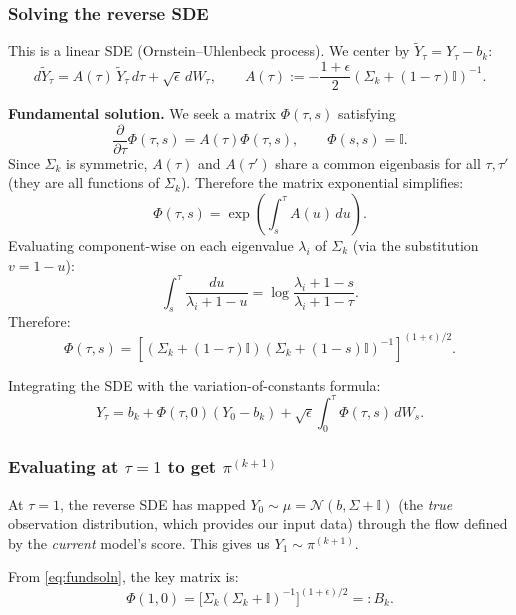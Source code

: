\documentclass[12pt,fleqn]{article}
\numberwithin{equation}{section}
\newcommand{\N}{\mathcal{N}}
\newcommand{\I}{\mathbb{I}}
\begin{document}
\subsubsection{Solving the reverse SDE}

This is a linear SDE (Ornstein--Uhlenbeck process). We center by $\tilde Y_\tau = Y_\tau - b_k$:
\[
	d\tilde Y_\tau = A(\tau)\,\tilde Y_\tau\,d\tau + \sqrt{\epsilon}\,dW_\tau, \qquad A(\tau) := -\frac{1+\epsilon}{2}(\Sigma_k + (1-\tau)\I)^{-1}.
\]

\begin{sidework}
\noindent\textbf{Fundamental solution.} We seek a matrix $\Phi(\tau,s)$ satisfying
\[
	\frac{\partial}{\partial\tau}\Phi(\tau,s) = A(\tau)\Phi(\tau,s), \qquad \Phi(s,s) = \I.
\]
Since $\Sigma_k$ is symmetric, $A(\tau)$ and $A(\tau')$ share a common eigenbasis for all $\tau, \tau'$ (they are all functions of $\Sigma_k$). Therefore the matrix exponential simplifies:
\[
	\Phi(\tau,s) = \exp\!\left(\int_s^\tau A(u)\,du\right).
\]
Evaluating component-wise on each eigenvalue $\lambda_i$ of $\Sigma_k$ (via the substitution $v = 1-u$):
\[
	\int_s^\tau \frac{du}{\lambda_i + 1 - u} = \log\frac{\lambda_i + 1 - s}{\lambda_i + 1 - \tau}.
\]
Therefore:
\begin{equation}
	\Phi(\tau,s) = \left[(\Sigma_k + (1-\tau)\I)(\Sigma_k + (1-s)\I)^{-1}\right]^{(1+\epsilon)/2}. \label{eq:fundsoln}
\end{equation}
\end{sidework}

Integrating the SDE with the variation-of-constants formula:
\begin{equation}
	Y_\tau = b_k + \Phi(\tau,0)(Y_0 - b_k) + \sqrt{\epsilon}\int_0^\tau \Phi(\tau,s)\,dW_s. \label{eq:Ysoln}
\end{equation}

\subsubsection{Evaluating at $\tau = 1$ to get $\pi^{(k+1)}$}

At $\tau = 1$, the reverse SDE has mapped $Y_0 \sim \mu = \N(b, \Sigma + \I)$ (the \emph{true} observation distribution, which provides our input data) through the flow defined by the \emph{current} model's score. This gives us $Y_1 \sim \pi^{(k+1)}$.

From \eqref{eq:fundsoln}, the key matrix is:
\begin{equation}
	\Phi(1,0) = \bigl[\Sigma_k(\Sigma_k + \I)^{-1}\bigr]^{(1+\epsilon)/2} =: B_k. \label{eq:Bk}
\end{equation}
\end{document}
